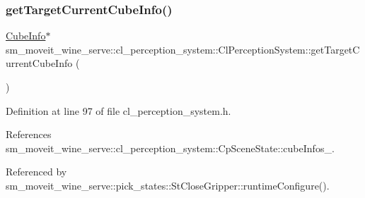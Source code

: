 \subsubsection{\texorpdfstring{get\+Target\+Current\+Cube\+Info()}{getTargetCurrentCubeInfo()}}
{\footnotesize\ttfamily \hyperlink{structsm__moveit__wine__serve_1_1cl__perception__system_1_1CubeInfo}{Cube\+Info}$\ast$ sm\+\_\+moveit\+\_\+wine\+\_\+serve\+::cl\+\_\+perception\+\_\+system\+::\+Cl\+Perception\+System\+::get\+Target\+Current\+Cube\+Info (\begin{DoxyParamCaption}{ }\end{DoxyParamCaption})\hspace{0.3cm}{\ttfamily [inline]}}



Definition at line 97 of file cl\+\_\+perception\+\_\+system.\+h.



References sm\+\_\+moveit\+\_\+wine\+\_\+serve\+::cl\+\_\+perception\+\_\+system\+::\+Cp\+Scene\+State\+::cube\+Infos\+\_\+.



Referenced by sm\+\_\+moveit\+\_\+wine\+\_\+serve\+::pick\+\_\+states\+::\+St\+Close\+Gripper\+::runtime\+Configure().


